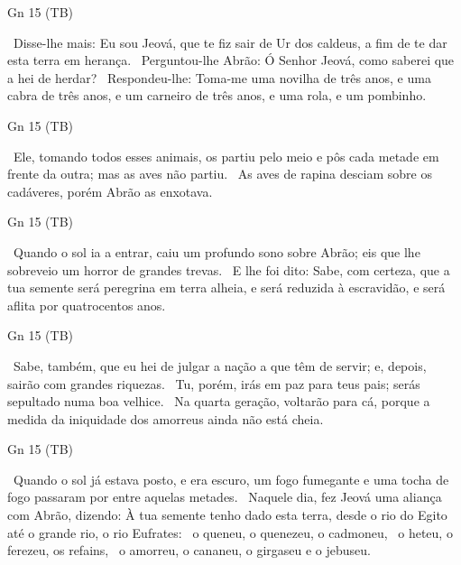 \documentclass[12pt,aspectratio=169]{beamer}
\newcommand{\ver}[1]{%
    \raisebox{0.50ex}{%
        \scalebox{1.1}{%
            \pmb{\textbf{\textcolor{BSpbg}{#1}}}%
        }%
    }%
}
\newcommand{\QUOTE}[1]{%
    \par\noindent\hspace*{0.05\linewidth}%
    \begin{minipage}{0.9\linewidth}%
        \linespread{1.35}\large{#1}%
    \end{minipage}%
}
\newcommand{\RED}[1]{{\textcolor{TXred}{#1}}}
\newcommand{\ORA}[1]{{\textcolor{TXred!50!TXyel}{#1}}}
\newcommand{\YEL}[1]{{\textcolor{TXyel}{#1}}}
\newcommand{\GRE}[1]{{\textcolor{TXgre}{#1}}}
\begin{document}
    \begin{frame}{Gn 15 (TB)}
        \QUOTE{%
            \ver{7}~Disse-lhe mais: Eu sou Jeová, que te fiz sair de Ur dos caldeus, a fim de te
            dar \YEL{esta terra em herança}.
            \ver{8}~Perguntou-lhe Abrão: Ó Senhor Jeová, \YEL{como saberei} que a hei de herdar?
            \ver{9}~Respondeu-lhe: \YEL{Toma-me uma novilha} de três anos, e uma cabra de três
            anos, e um carneiro de três anos, e uma rola, e um pombinho.
        }
    \end{frame}

    \begin{frame}{Gn 15 (TB)}
        \QUOTE{%
            \ver{10}~Ele, tomando todos esses animais, os partiu pelo meio e pôs cada metade em
            frente da outra; mas as aves não partiu.
            \ver{11}~As aves de rapina desciam sobre os cadáveres, porém Abrão as enxotava.
        }
    \end{frame}

    \begin{frame}{Gn 15 (TB)}
        \QUOTE{%
            \ver{12}~Quando o sol ia a entrar, caiu um \ORA{profundo sono} sobre Abrão; eis que
            lhe sobreveio um \RED{horror de grandes trevas}.
            \ver{13}~E lhe foi dito: Sabe, \YEL{com certeza}, que a \RED{tua semente será
            peregrina} em \RED{terra alheia}, e será \RED{reduzida à escravidão}, e será
            \RED{aflita} por quatrocentos anos.
        }
    \end{frame}

    \begin{frame}{Gn 15 (TB)}
        \QUOTE{%
            \ver{14}~Sabe, também, que eu hei de \RED{julgar} a nação a que têm de servir; e,
            depois, \YEL{sairão} com grandes riquezas.
            \ver{15}~Tu, porém, \YEL{irás em paz} para teus pais; serás sepultado numa boa
            \YEL{velhice}.
            \ver{16}~Na quarta geração, voltarão para cá, \YEL{porque} a \RED{medida da
            iniquidade dos amorreus ainda não está cheia}.
        }
    \end{frame}

    \begin{frame}{Gn 15 (TB)}
        \QUOTE{%
            \ver{17}~Quando o sol já estava posto, e era escuro, um \YEL{fogo fumegante e uma
            tocha de fogo passaram por entre aquelas metades}.
            \ver{18}~Naquele dia, \YEL{fez Jeová uma aliança com Abrão}, dizendo: \GRE{À tua
            semente tenho dado esta terra, desde o rio do Egito até o grande rio, o rio
            Eufrates}:
            \ver{19}~o queneu, o quenezeu, o cadmoneu,
            \ver{20}~o heteu, o ferezeu, os refains,
            \ver{21}~o amorreu, o cananeu, o girgaseu e o jebuseu.
        }
    \end{frame}
\end{document}
